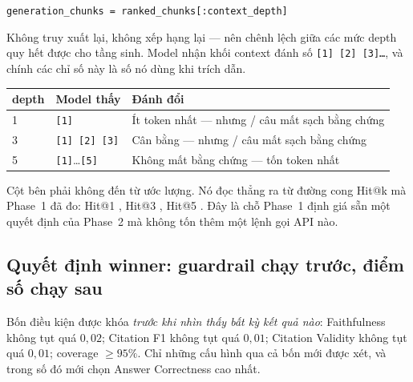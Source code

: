 \begin{center}
\texttt{generation\_chunks = ranked\_chunks[:context\_depth]}
\end{center}

Không truy xuất lại, không xếp hạng lại --- nên chênh lệch giữa các mức depth
quy hết được cho tầng sinh. Model nhận khối context đánh số \texttt{[1] [2]
[3]\ldots}, và chính các chỉ số này là số nó dùng khi trích dẫn.

\begin{center}\small
\begin{tabularx}{0.94\textwidth}{@{}p{1.4cm} p{2.6cm} L@{}}
\toprule
\textbf{depth} & \textbf{Model thấy} & \textbf{Đánh đổi} \\
 & \texttt{[1]} & Ít token nhất --- nhưng \NumLostAtDepthOne{}/\NumNDev{} câu mất sạch bằng chứng \\
3 & \texttt{[1] [2] [3]} & Cân bằng --- nhưng \NumLostAtDepthThree{}/\NumNDev{} câu mất sạch bằng chứng \\
5 & \texttt{[1]}\ldots\texttt{[5]} & Không mất bằng chứng --- tốn token nhất \\
\bottomrule
\end{tabularx}
\end{center}

Cột bên phải không đến từ ước lượng. Nó đọc thẳng ra từ đường cong Hit@k mà
Phase~1 đã đo: Hit@1 \NumPoneHitOne{}, Hit@3 \NumPoneHitThree{}, Hit@5
\NumPoneHitFive{}. Đây là chỗ Phase~1 định giá sẵn một quyết định của Phase~2
mà không tốn thêm một lệnh gọi API nào.

\subsection{Quyết định winner: guardrail chạy trước, điểm số chạy sau}

Bốn điều kiện được khóa \emph{trước khi nhìn thấy bất kỳ kết quả nào}:
Faithfulness không tụt quá $0{,}02$; Citation F1 không tụt quá $0{,}01$;
Citation Validity không tụt quá $0{,}01$; coverage $\geq 95\%$. Chỉ những cấu
hình qua cả bốn mới được xét, và trong số đó mới chọn Answer Correctness cao
nhất.

